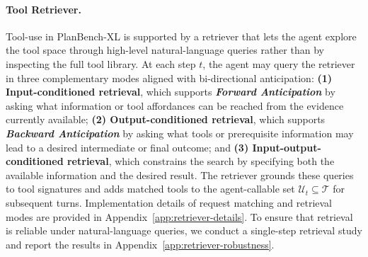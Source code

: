 \documentclass{llmxive}
\providecommand{\bench}[1]{PlanBench-XL}
\begin{document}
\paragraph{Tool Retriever.}

Tool-use in \bench{} is supported by a retriever that lets the agent explore the tool space through high-level natural-language queries rather than by inspecting the full tool library. 
At each step $t$, the agent may query the retriever in three complementary modes aligned with bi-directional anticipation:
\textbf{(1) Input-conditioned retrieval}, which supports \textbf{\textit{Forward Anticipation}} by asking what information or tool affordances can be reached from the evidence currently available;
\textbf{(2) Output-conditioned retrieval}, which supports \textbf{\textit{Backward Anticipation}} by asking what tools or prerequisite information may lead to a desired intermediate or final outcome;
and \textbf{(3) Input-output-conditioned retrieval}, which constrains the search by specifying both the available information and the desired result. 
The retriever grounds these queries to tool signatures and adds matched tools to the agent-callable set \(\mathcal{U}_t \subseteq \mathcal{T}\) for subsequent turns.
Implementation details of request matching and retrieval modes are provided in Appendix~\ref{app:retriever-details}.
To ensure that retrieval is reliable under natural-language queries, we conduct a single-step retrieval study and report the results in Appendix~\ref{app:retriever-robustness}.



\end{document}
